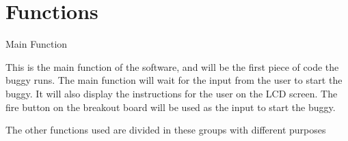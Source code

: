 \chapter{Functions}
\hypertarget{functions}{}\label{functions}
 Main Function  
\begin{DoxyCode}{0}

\end{DoxyCode}
 This is the main function of the software, and will be the first piece of code the buggy runs. The main function will wait for the input from the user to start the buggy. It will also display the instructions for the user on the LCD screen. The fire button on the breakout board will be used as the input to start the buggy.

The other functions used are divided in these groups with different purposes
\begin{DoxyItemize}
\item {}
\item {} 
\end{DoxyItemize}

